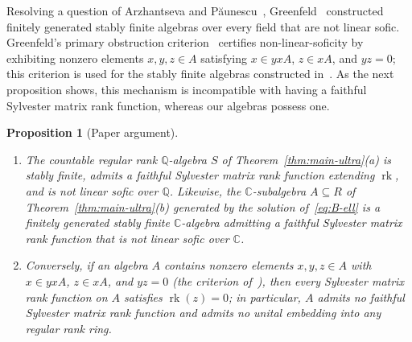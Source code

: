 \documentclass[11pt]{article}
\newtheorem{proposition}[theorem]{Proposition}
\theoremstyle{definition}
\theoremstyle{remark}
\numberwithin{equation}{section}
\DeclareMathOperator{\rk}{rk}
\newcommand{\Q}{\mathbb{Q}}
\newcommand{\C}{\mathbb{C}}
\newcommand{\1}{\mathbf{1}}
\begin{document}
Resolving a question of Arzhantseva and P\u{a}unescu~\cite{AP2017}, Greenfeld~\cite{Greenfeld2023} constructed finitely generated stably finite algebras over every field that are not linear sofic. Greenfeld's primary obstruction criterion~\cite[Lemma~2.1]{Greenfeld2023} certifies non-linear-soficity by exhibiting nonzero elements $x, y, z \in A$ satisfying $x \in yxA$, $z \in xA$, and $yz = 0$; this criterion is used for the stably finite algebras constructed in~\cite{Greenfeld2023}. As the next proposition shows, this mechanism is incompatible with having a faithful Sylvester matrix rank function, whereas our algebras possess one.

\begin{proposition}[Paper argument]
\label{prop:stably-finite}
\leavevmode
\begin{enumerate}[label=\textup{(\alph*)},leftmargin=2.2em]
\item The countable regular rank $\Q$-algebra $S$ of Theorem~\ref{thm:main-ultra}\textup{(a)} is stably finite, admits a faithful Sylvester matrix rank function extending $\rk$, and is not linear sofic over $\Q$. Likewise, the $\C$-subalgebra $A \subseteq R$ of Theorem~\ref{thm:main-ultra}\textup{(b)} generated by the solution of~\eqref{eq:B-ell} is a finitely generated stably finite $\C$-algebra admitting a faithful Sylvester matrix rank function that is not linear sofic over $\C$.
\item Conversely, if an algebra $A$ contains nonzero elements $x, y, z \in A$ with $x \in yxA$, $z \in xA$, and $yz = 0$ (the criterion of~\cite[Lemma~2.1]{Greenfeld2023}), then every Sylvester matrix rank function on $A$ satisfies $\rk(z) = 0$; in particular, $A$ admits no faithful Sylvester matrix rank function and admits no unital embedding into any regular rank ring.
\end{enumerate}
\end{proposition}
\end{document}

